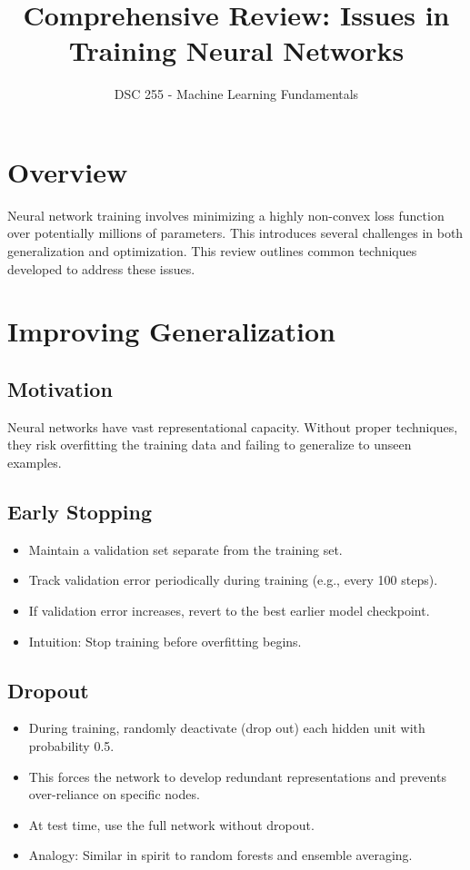 \documentclass[11pt]{article}
\title{Comprehensive Review: Issues in Training Neural Networks}
\author{DSC 255 - Machine Learning Fundamentals}
\date{}
\begin{document}
\maketitle
\tableofcontents
\newpage

\section{Overview}

Neural network training involves minimizing a highly non-convex loss function over potentially millions of parameters. This introduces several challenges in both generalization and optimization. This review outlines common techniques developed to address these issues.

\section{Improving Generalization}

\subsection*{Motivation}

Neural networks have vast representational capacity. Without proper techniques, they risk overfitting the training data and failing to generalize to unseen examples.

\subsection{Early Stopping}

\begin{itemize}
    \item Maintain a validation set separate from the training set.
    \item Track validation error periodically during training (e.g., every 100 steps).
    \item If validation error increases, revert to the best earlier model checkpoint.
    \item Intuition: Stop training before overfitting begins.
\end{itemize}

\subsection{Dropout}

\begin{itemize}
    \item During training, randomly deactivate (drop out) each hidden unit with probability 0.5.
    \item This forces the network to develop redundant representations and prevents over-reliance on specific nodes.
    \item At test time, use the full network without dropout.
    \item Analogy: Similar in spirit to random forests and ensemble averaging.
\end{itemize}
\end{document}
